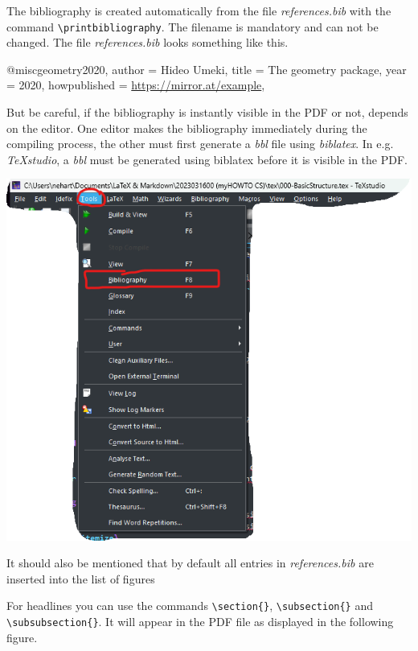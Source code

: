 The bibliography is created automatically from the file \emph{references.bib} with the command \Verb|\printbibliography|. The filename is mandatory and can not be changed. The file \emph{references.bib} looks something like this.

\begin{myFILE}{}
@misc{geometry2020,
	author = {{Hideo Umeki}},
	title = {{The geometry package}},
	year = {2020}, 
	howpublished = {\url{https://mirror.at/example}},
}
\end{myFILE}

But be careful, if the bibliography is instantly visible in the PDF or not, depends on the editor. One editor makes the bibliography immediately during the compiling process, the other must first generate a \emph{bbl} file using \emph{biblatex}. In e.g. \emph{\TeX studio}, a \emph{bbl} must be generated using biblatex before it is visible in the PDF.

\centering
\begin{myFIG}{}
	\includegraphics[scale=0.4]{pictures/Using_biblatex_in_TeXstudio.png}
\end{myFIG}

\justifying

It should also be mentioned that by default all entries in \emph{references.bib} are inserted into the list of figures

For headlines you can use the commands \Verb|\section{}|, \Verb|\subsection{}| and \\ \Verb|\subsubsection{}|. It will appear in the PDF file as displayed in the following figure.

